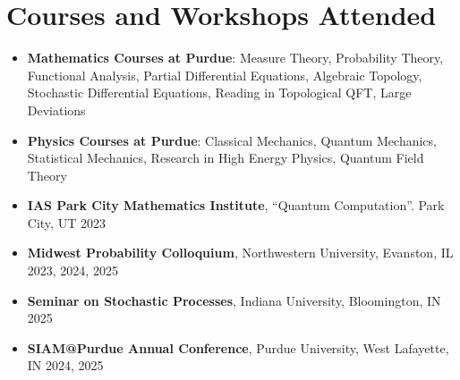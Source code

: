 \documentclass[11pt,letterpaper]{article}
\begin{document}
\section*{Courses and Workshops Attended}
\begin{itemize}
    \item \textbf{Mathematics Courses at Purdue}: Measure Theory, Probability Theory, Functional Analysis, Partial Differential Equations, Algebraic Topology, Stochastic Differential Equations, Reading in Topological QFT, Large Deviations
    \item \textbf{Physics Courses at Purdue}: Classical Mechanics, Quantum Mechanics, Statistical Mechanics, Research in High Energy Physics, Quantum Field Theory
    \item \textbf{IAS Park City Mathematics Institute}, ``Quantum Computation''. Park City, UT \hfill 2023
    \item \textbf{Midwest Probability Colloquium}, Northwestern University, Evanston, IL \hfill 2023, 2024, 2025
    \item \textbf{Seminar on Stochastic Processes}, Indiana University, Bloomington, IN \hfill 2025
    \item \textbf{SIAM@Purdue Annual Conference}, Purdue University, West Lafayette, IN \hfill 2024, 2025
\end{itemize}

\end{document}
